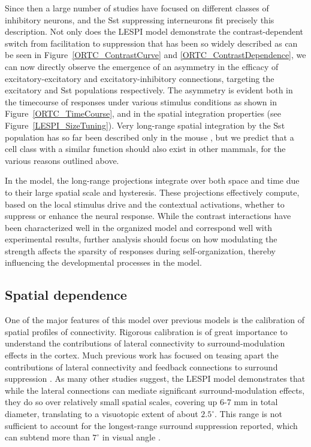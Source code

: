 Since then a large number of studies have focused on different classes
of inhibitory neurons, and the Sst suppressing interneurons fit
precisely this description. Not only does the LESPI model demonstrate the
contrast-dependent switch from facilitation to suppression that has
been so widely described \citep{Levitt1997, Polat1998, Dragoi2000,
  Wang2009} as can be seen in Figure~\ref{ORTC_ContrastCurve} and
\ref{ORTC_ContrastDependence}, we can now directly observe the
emergence of an asymmetry in the efficacy of excitatory-excitatory and
excitatory-inhibitory connections, targeting the excitatory and Sst
populations respectively. The asymmetry is evident both in the
timecourse of responses under various stimulus conditions as shown in
Figure~\ref{ORTC_TimeCourse}, and in the spatial integration properties
(see Figure~\ref{LESPI_SizeTuning}). Very long-range
spatial integration by the Sst population has so far been described
only in the mouse \citep{Adesnik2012}, but we predict that a cell class
with a similar function should also exist in other mammals, for the
various reasons outlined above.

In the model, the long-range projections integrate over both space and
time due to their large spatial scale and hysteresis.  These
projections effectively compute, based on the local stimulus drive and
the contextual activations, whether to suppress or enhance the neural
response. While the contrast interactions have been characterized well
in the organized model and correspond well with experimental results,
further analysis should focus on how modulating the strength affects
the sparsity of responses during self-organization, thereby
influencing the developmental processes in the model.

\subsection{Spatial dependence}

One of the major features of this model over previous models is the
calibration of spatial profiles of connectivity. Rigorous calibration
is of great importance to understand the contributions of lateral
connectivity to surround-modulation effects in the cortex. Much
previous work has focused on teasing apart the contributions of
lateral connectivity and feedback connections to surround suppression
\citep{Angelucci2002, Bair2003, Schwabe2006}. As many other studies
suggest, the LESPI model demonstrates that while the lateral
connections can mediate significant surround-modulation effects, they
do so over relatively small spatial scales, covering up 6-7 mm in
total diameter, translating to a visuotopic extent of about
$2.5^\circ$.  This range is not sufficient to account for the
longest-range surround suppression reported, which can subtend more
than $7^\circ$ in visual angle \citep{Bair2003, Levitt2002}.

